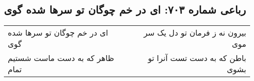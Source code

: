 \begin{center}
\section*{رباعی شماره ۷۰۳: ای در خم چوگان تو سرها شده گوی}
\label{sec:sh703}
\begin{longtable}{l p{0.5cm} r}
ای در خم چوگان تو سرها شده گوی
&&
بیرون نه ز فرمان تو دل یک سر موی
\\
ظاهر که به دست ماست شستیم تمام
&&
باطن که به دست تست آنرا تو بشوی
\\
\end{longtable}
\end{center}
